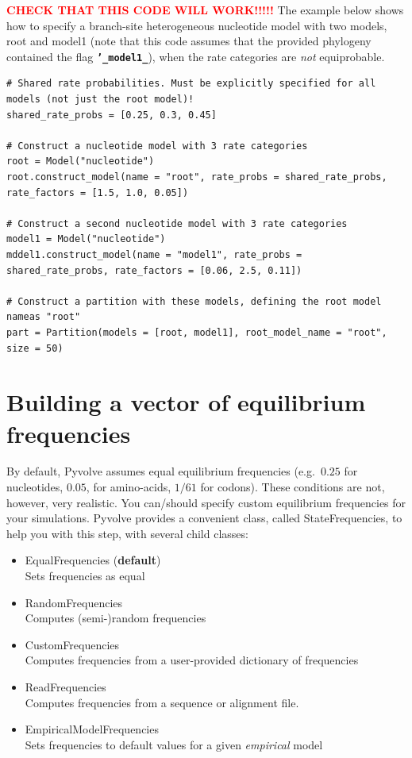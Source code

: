 \documentclass{article}
\newcommand{\code}[1]{\textbf{\texttt{\small{#1}}}}
\begin{document}


\textcolor{red}{\textbf{CHECK THAT THIS CODE WILL WORK!!!!!}}
The example below shows how to specify a branch-site heterogeneous nucleotide model with two models, root and model1 (note that this code assumes that the provided phylogeny contained the flag \code{'\_model1\_}), when the rate categories are \emph{not} equiprobable.
\begin{lstlisting}
# Shared rate probabilities. Must be explicitly specified for all models (not just the root model)!
shared_rate_probs = [0.25, 0.3, 0.45]

# Construct a nucleotide model with 3 rate categories
root = Model("nucleotide")
root.construct_model(name = "root", rate_probs = shared_rate_probs, rate_factors = [1.5, 1.0, 0.05])

# Construct a second nucleotide model with 3 rate categories
model1 = Model("nucleotide")
mddel1.construct_model(name = "model1", rate_probs = shared_rate_probs, rate_factors = [0.06, 2.5, 0.11])

# Construct a partition with these models, defining the root model nameas "root"
part = Partition(models = [root, model1], root_model_name = "root", size = 50)
\end{lstlisting}


\section{Building a vector of equilibrium frequencies}\label{sec:freqs}

By default, Pyvolve assumes equal equilibrium frequencies (e.g.\ $0.25$ for nucleotides, $0.05$, for amino-acids, $1/61$ for codons). These conditions are not, however, very realistic. You can/should specify custom equilibrium frequencies for your simulations. Pyvolve provides a convenient class, called StateFrequencies, to help you with this step, with several child classes:
\begin{itemize}
	\item EqualFrequencies (\textbf{default}) \\ Sets frequencies as equal 
	\item RandomFrequencies \\ Computes (semi-)random frequencies
	\item CustomFrequencies \\ Computes frequencies from a user-provided dictionary of frequencies
	\item ReadFrequencies \\ Computes frequencies from a sequence or alignment file.
	\item EmpiricalModelFrequencies \\ Sets frequencies to default values for a given \emph{empirical} model		
\end{itemize}
\end{document}
